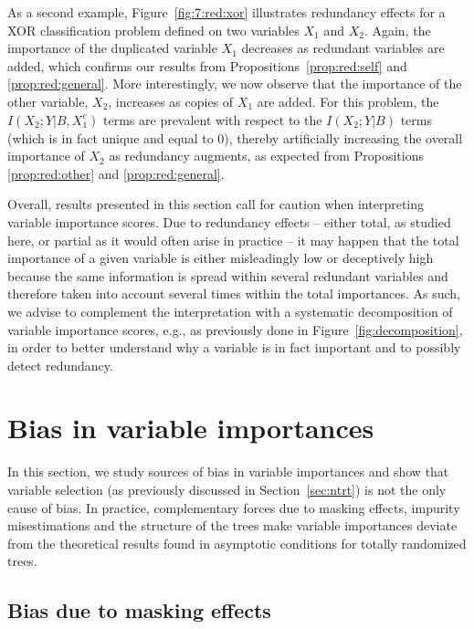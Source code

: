 As a second example, Figure~\ref{fig:7:red:xor} illustrates redundancy effects
for a XOR classification problem defined on two variables $X_1$ and $X_2$.
Again, the importance of the duplicated variable $X_1$  decreases as redundant
variables are added, which confirms our results from
Propositions~\ref{prop:red:self} and \ref{prop:red:general}. More
interestingly, we now observe that the importance of the other variable, $X_2$,
increases as copies of $X_1$ are added. For this problem, the
$I(X_2;Y|B,X_1^c)$ terms are prevalent with respect to the $I(X_2;Y|B)$ terms
(which is in fact unique and equal to $0$), thereby artificially increasing the
overall importance of $X_2$ as redundancy augments, as expected from
Propositions \ref{prop:red:other} and \ref{prop:red:general}.

Overall, results presented in this section call for caution when interpreting
variable importance scores. Due to redundancy effects -- either total, as studied
here, or partial as it would often arise in practice -- it may happen that the
total importance of a given variable is either misleadingly low or deceptively
high because the same information is spread within several redundant variables
and therefore taken into account several times within the total importances. As
such, we advise to complement the interpretation with a systematic
decomposition of variable importance scores, e.g., as previously done in
Figure~\ref{fig:decomposition}, in order to better understand why a variable is
in fact important and to possibly detect redundancy.


\section{Bias in variable importances}
\label{sec:7:bias}

In this section, we study sources of bias in variable importances and show that
variable selection (as previously discussed in Section~\ref{sec:ntrt}) is  not
the only cause of bias. In practice, complementary forces due to masking
effects, impurity misestimations and the structure of the trees make variable
importances deviate from the theoretical results found in asymptotic conditions
for totally randomized trees.

\subsection{Bias due to masking effects}

